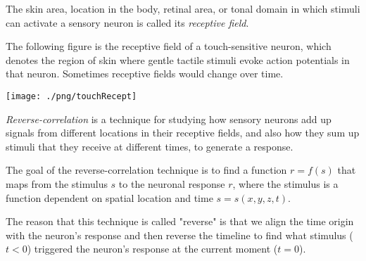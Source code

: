 
\begin{defn}
  \label{defn:ReceptiveField}
  The skin area, location in the body, retinal area, or tonal domain in which stimuli can activate a sensory neuron is called its \emph{receptive field}.
\end{defn}
\begin{rem}
  The following figure is the receptive field of a touch-sensitive neuron, which denotes the region of skin where gentle tactile stimuli evoke action potentials in that neuron. Sometimes receptive fields would change over time.
  \begin{center}
    \texttt{[image: ./png/touchRecept]}
  \end{center}
\end{rem}


\begin{defn}
  \label{defn:reverse-correlation}
  \emph{Reverse-correlation} is a technique for studying
  how sensory neurons add up signals from different locations
  in their receptive fields, and also how they sum up stimuli
  that they receive at different times, to generate a response.
\end{defn}

\begin{rem}
  The goal of the reverse-correlation technique is to find a function $r = f(s)$ that maps from the stimulus $s$ to the neuronal response $r$, where the stimulus is a function dependent on spatial location and time $s = s(x,y,z,t)$. 
\end{rem}

\begin{rem}
  The reason that this technique is called "reverse" is that we align the time origin with the neuron's response and then reverse the timeline to find what stimulus ($t<0$) triggered the neuron's response at the current moment ($t=0$).
\end{rem}



